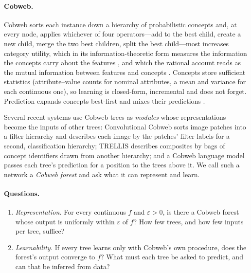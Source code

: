 \documentclass[11pt]{article}
\theoremstyle{definition}
\theoremstyle{remark}
\begin{document}
\paragraph{Cobweb.}
Cobweb \citep{fisher1987} sorts each instance down a hierarchy of probabilistic
concepts and, at every node, applies whichever of four operators---add to the best
child, create a new child, merge the two best children, split the best child---most
increases category utility, which in its information-theoretic form measures the
information the concepts carry about the features \citep{corter1992}, and which the
rational account reads as the mutual information between features and concepts
\citep{maclellan2026rational}.
Concepts store sufficient statistics (attribute--value counts for nominal attributes,
a mean and variance for each continuous one), so learning is closed-form, incremental
and does not forget.  Prediction expands concepts best-first and mixes their
predictions \citep{maclellan2026rational}.

Several recent systems use Cobweb trees as \emph{modules} whose representations become
the inputs of other trees: Convolutional Cobweb \citep{maclellan2021conv} sorts image
patches into a filter hierarchy and describes each image by the patches' filter labels
for a second, classification hierarchy; TRELLIS \citep{singaravadivelan2026trellis}
describes composites by bags of concept identifiers drawn from another hierarchy; and a
Cobweb language model passes each tree's prediction for a position to the trees above
it.  We call such a network a \emph{Cobweb forest} and ask what it can represent and
learn.

\paragraph{Questions.}
\begin{enumerate}[label=\textbf{Q\arabic*.},leftmargin=*]
\item \emph{Representation.} For every continuous $f$ and $\varepsilon>0$, is there a
  Cobweb forest whose output is uniformly within $\varepsilon$ of $f$?  How few trees,
  and how few inputs per tree, suffice?
\item \emph{Learnability.} If every tree learns only with Cobweb's own procedure, does
  the forest's output converge to $f$?  What must each tree be asked to predict, and can
  that be inferred from data?
\end{enumerate}
\end{document}
